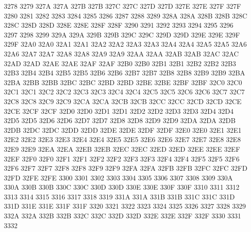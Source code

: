  3278
 3279
\ID 327A 327A
\ID 327B 327B
\ID 327C 327C
\ID 327D 327D
\ID 327E 327E
\ID 327F 327F
 3280
 3281
 3282
 3283
 3284
 3285
 3286
 3287
 3288
 3289
\ID 328A 328A
\ID 328B 328B
\ID 328C 328C
\ID 328D 328D
\ID 328E 328E
\ID 328F 328F
 3290
 3291
 3292
 3293
 3294
 3295
 3296
 3297
 3298
 3299
\ID 329A 329A
\ID 329B 329B
\ID 329C 329C
\ID 329D 329D
\ID 329E 329E
\ID 329F 329F
\ID 32A0 32A0
\ID 32A1 32A1
\ID 32A2 32A2
\ID 32A3 32A3
\ID 32A4 32A4
\ID 32A5 32A5
\ID 32A6 32A6
\ID 32A7 32A7
\ID 32A8 32A8
\ID 32A9 32A9
\ID 32AA 32AA
\ID 32AB 32AB
\ID 32AC 32AC
\ID 32AD 32AD
\ID 32AE 32AE
\ID 32AF 32AF
\ID 32B0 32B0
\ID 32B1 32B1
\ID 32B2 32B2
\ID 32B3 32B3
\ID 32B4 32B4
\ID 32B5 32B5
\ID 32B6 32B6
\ID 32B7 32B7
\ID 32B8 32B8
\ID 32B9 32B9
\ID 32BA 32BA
\ID 32BB 32BB
\ID 32BC 32BC
\ID 32BD 32BD
\ID 32BE 32BE
\ID 32BF 32BF
\ID 32C0 32C0
\ID 32C1 32C1
\ID 32C2 32C2
\ID 32C3 32C3
\ID 32C4 32C4
\ID 32C5 32C5
\ID 32C6 32C6
\ID 32C7 32C7
\ID 32C8 32C8
\ID 32C9 32C9
\ID 32CA 32CA
\ID 32CB 32CB
\ID 32CC 32CC
\ID 32CD 32CD
\ID 32CE 32CE
\ID 32CF 32CF
\ID 32D0 32D0
\ID 32D1 32D1
\ID 32D2 32D2
\ID 32D3 32D3
\ID 32D4 32D4
\ID 32D5 32D5
\ID 32D6 32D6
\ID 32D7 32D7
\ID 32D8 32D8
\ID 32D9 32D9
\ID 32DA 32DA
\ID 32DB 32DB
\ID 32DC 32DC
\ID 32DD 32DD
\ID 32DE 32DE
\ID 32DF 32DF
\ID 32E0 32E0
\ID 32E1 32E1
\ID 32E2 32E2
\ID 32E3 32E3
\ID 32E4 32E4
\ID 32E5 32E5
\ID 32E6 32E6
\ID 32E7 32E7
\ID 32E8 32E8
\ID 32E9 32E9
\ID 32EA 32EA
\ID 32EB 32EB
\ID 32EC 32EC
\ID 32ED 32ED
\ID 32EE 32EE
\ID 32EF 32EF
\ID 32F0 32F0
\ID 32F1 32F1
\ID 32F2 32F2
\ID 32F3 32F3
\ID 32F4 32F4
\ID 32F5 32F5
\ID 32F6 32F6
\ID 32F7 32F7
\ID 32F8 32F8
\ID 32F9 32F9
\ID 32FA 32FA
\ID 32FB 32FB
\ID 32FC 32FC
\ID 32FD 32FD
\ID 32FE 32FE
 3300
 3301
 3302
 3303
 3304
 3305
 3306
 3307
 3308
 3309
\ID 330A 330A
\ID 330B 330B
\ID 330C 330C
\ID 330D 330D
\ID 330E 330E
\ID 330F 330F
 3310
 3311
 3312
 3313
 3314
 3315
 3316
 3317
 3318
 3319
\ID 331A 331A
\ID 331B 331B
\ID 331C 331C
\ID 331D 331D
\ID 331E 331E
\ID 331F 331F
 3320
 3321
 3322
 3323
 3324
 3325
 3326
 3327
 3328
 3329
\ID 332A 332A
\ID 332B 332B
\ID 332C 332C
\ID 332D 332D
\ID 332E 332E
\ID 332F 332F
 3330
 3331
 3332
